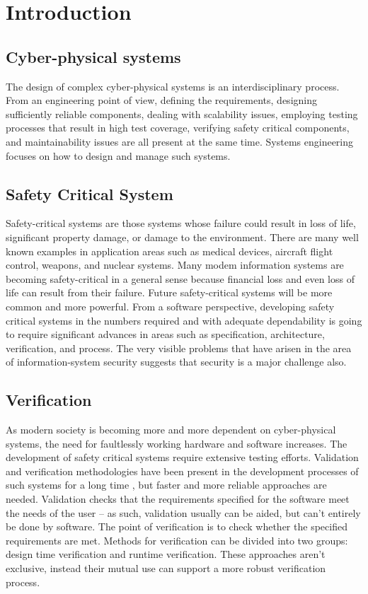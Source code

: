 \chapter{Introduction}
\label{chap:intro}

\section{Cyber-physical systems}

The design of complex cyber-physical systems is an interdisciplinary process. From an engineering point of view, defining the requirements, designing sufficiently reliable components, dealing with scalability issues, employing testing processes that result in high test coverage, verifying safety critical components, and maintainability issues are all present at the same time. Systems engineering focuses on how to design and manage such systems. \cite{randomwikipedialink1} \cite{randomwikipedialink2}

\section{Safety Critical System}

Safety-critical systems are those systems whose failure could result in loss of life, significant property damage, or damage to the environment. There are many well known examples in application areas such as medical devices, aircraft flight control, weapons, and nuclear systems. Many modem information systems are becoming safety-critical in a general sense because financial loss and even loss of life can result from their failure. Future safety-critical systems will be more common and more powerful. From a software perspective, developing safety critical systems in the numbers required and with adequate dependability is going to require significant advances in areas such as specification, architecture, verification, and process. The very visible problems that have arisen in the area of information-system security suggests that security is a major challenge also. \cite{safetycritical}

\section{Verification}

As modern society is becoming more and more dependent on cyber-physical systems, the need for faultlessly working hardware and software increases. The development of safety critical systems require extensive testing efforts. Validation and verification methodologies have been present in the development processes of such systems for a long time \citep{ieee1012}, but faster and more reliable approaches are needed. Validation checks that the requirements specified for the software meet the needs of the user -- as such, validation usually can be aided, but can’t entirely be done by software. The point of verification is to check whether the specified requirements are met. Methods for verification can be divided into two groups: design time verification and runtime verification. These approaches aren't exclusive, instead their mutual use can support a more robust verification process.

